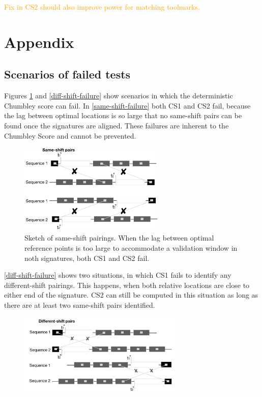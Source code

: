 \documentclass[12pt]{article}
\begin{document}
{\textcolor{orange}{
Fix in CS2 should also improve power for matching toolmarks. 
}}

\hypertarget{appendix}{%
\section{Appendix}\label{appendix}}

\begin{appendix}

\section{Scenarios of failed tests}

Figures \ref{same-shift-failure} and \ref{diff-shift-failure} show scenarios in which the deterministic Chumbley score can fail. 
In \autoref{same-shift-failure} both CS1 and CS2 fail, because the lag between optimal locations is so large that no same-shift pairs can be found once the signatures are aligned. These failures are inherent to the Chumbley Score and cannot be prevented.
\begin{figure}[hbtp]
\centering
\includegraphics[width=0.62\textwidth]{images/same-shift-failure.png}

\caption{\label{same-shift-failure}Sketch of same-shift pairings. When the lag between optimal reference points is too large to accommodate a validation window in noth signatures, both CS1 and CS2 fail.}
\end{figure}

\autoref{diff-shift-failure} shows two situations, in which CS1 fails to identify any different-shift pairings. This happens, when both relative locations are close to either end of the signature. CS2 can still be computed in this situation as long as there are at least two same-shift pairs identified. 

\begin{figure}[hbtp]
\centering
\includegraphics[width=0.7\textwidth]{images/diff-shift-failure.png}


\end{figure}
\end{appendix}
\end{document}
